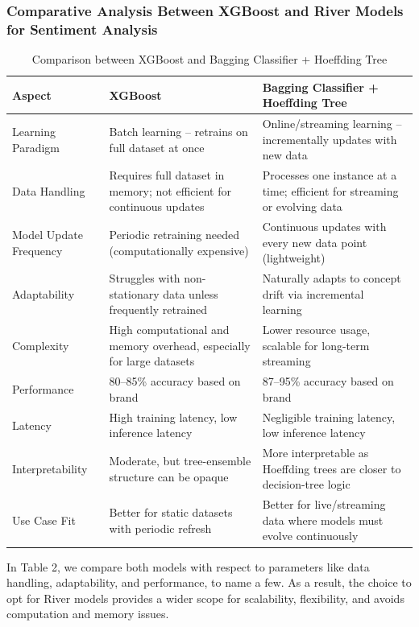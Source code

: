 \documentclass[pdflatex,sn-mathphys-num]{sn-jnl}%
\begin{document}
\subsubsection{Comparative Analysis Between XGBoost and River Models for Sentiment Analysis}
\begin{table}[h!]
\centering
\caption{Comparison between XGBoost and Bagging Classifier + Hoeffding Tree}
\label{tab:xgb-hoeffding}
\begin{tabular}{|l|p{5cm}|p{5cm}|}
\hline
\textbf{Aspect} & \textbf{XGBoost} & \textbf{Bagging Classifier + Hoeffding Tree} \\ \hline
Learning Paradigm & Batch learning – retrains on full dataset at once & Online/streaming learning – incrementally updates with new data \\ \hline
Data Handling & Requires full dataset in memory; not efficient for continuous updates & Processes one instance at a time; efficient for streaming or evolving data \\ \hline
Model Update Frequency & Periodic retraining needed (computationally expensive) & Continuous updates with every new data point (lightweight) \\ \hline
Adaptability & Struggles with non-stationary data unless frequently retrained & Naturally adapts to concept drift via incremental learning \\ \hline
Complexity & High computational and memory overhead, especially for large datasets & Lower resource usage, scalable for long-term streaming \\ \hline
Performance & 80--85\% accuracy based on brand & 87--95\% accuracy based on brand \\ \hline
Latency & High training latency, low inference latency & Negligible training latency, low inference latency \\ \hline
Interpretability & Moderate, but tree-ensemble structure can be opaque & More interpretable as Hoeffding trees are closer to decision-tree logic \\ \hline
Use Case Fit & Better for static datasets with periodic refresh & Better for live/streaming data where models must evolve continuously \\ \hline
\end{tabular}
\end{table}

In Table 2, we compare both models with respect to parameters like data handling, adaptability, and performance, to name a few. As a result, the choice to opt for River models provides a wider scope for scalability, flexibility, and avoids computation and memory issues.
\end{document}
